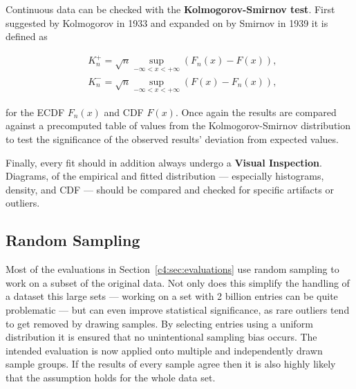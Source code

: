 Continuous data can be checked with the \textbf{Kolmogorov-Smirnov test}. First suggested by Kolmogorov in 1933 \cite{kolmogorov1933sulla} and expanded on by Smirnov in 1939 \cite{smirnov1939estimation} it is defined as

\begin{equation}
	\begin{aligned}
	\phantom{,}K_n^+ = \sqrt{n} \sup_{-\infty < x < + \infty} \left( F_n(x) - F(x) \right)\text{,} \\
	\phantom{,}K_n^- = \sqrt{n} \sup_{-\infty < x < + \infty} \left( F(x) - F_n(x) \right)\text{,}
	\end{aligned}
\end{equation}

for the \gls{ECDF} $F_n(x)$ and \gls{CDF} $F(x)$. Once again the results are compared against a precomputed table of values from the Kolmogorov-Smirnov distribution to test the significance of the observed results' deviation from expected values. 

Finally, every fit should in addition always undergo a \textbf{Visual Inspection}. Diagrams, of the empirical and fitted distribution --- especially histograms, density, and \gls{CDF} --- should be compared and checked for specific artifacts or outliers. 



\subsection{Random Sampling}

Most of the evaluations in Section~\ref{c4:sec:evaluations} use random sampling to work on a subset of the original data.  Not only does this simplify the handling of a dataset this large sets --- working on a set with 2 billion entries can be quite problematic --- but can even improve statistical significance, as rare outliers tend to get removed by drawing samples. By selecting entries using a uniform distribution it is ensured that no unintentional sampling bias occurs. The intended evaluation is now applied onto multiple and independently drawn sample groups. If the results of every sample agree then it is also highly likely that the assumption holds for the whole data set.

